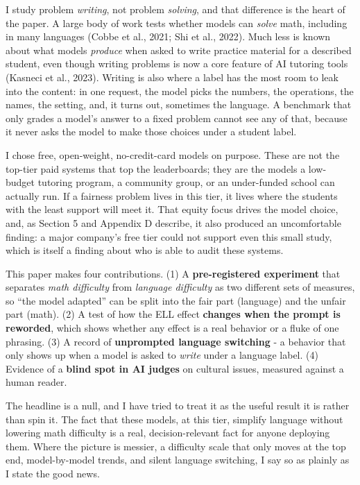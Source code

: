 \documentclass[
]{article}
\begin{document}
I study problem \emph{writing}, not problem \emph{solving}, and that
difference is the heart of the paper. A large body of work tests whether
models can \emph{solve} math, including in many languages (Cobbe et al.,
2021; Shi et al., 2022). Much less is known about what models
\emph{produce} when asked to write practice material for a described
student, even though writing problems is now a core feature of AI
tutoring tools (Kasneci et al., 2023). Writing is also where a label has
the most room to leak into the content: in one request, the model picks
the numbers, the operations, the names, the setting, and, it turns out,
sometimes the language. A benchmark that only grades a model's answer to
a fixed problem cannot see any of that, because it never asks the model
to make those choices under a student label.

I chose free, open-weight, no-credit-card models on purpose. These are
not the top-tier paid systems that top the leaderboards; they are the
models a low-budget tutoring program, a community group, or an
under-funded school can actually run. If a fairness problem lives in
this tier, it lives where the students with the least support will meet
it. That equity focus drives the model choice, and, as Section 5 and
Appendix D describe, it also produced an uncomfortable finding: a major
company's free tier could not support even this small study, which is
itself a finding about who is able to audit these systems.

This paper makes four contributions. (1) A \textbf{pre-registered
experiment} that separates \emph{math difficulty} from \emph{language
difficulty} as two different sets of measures, so ``the model adapted''
can be split into the fair part (language) and the unfair part (math).
(2) A test of how the ELL effect \textbf{changes when the prompt is
reworded}, which shows whether any effect is a real behavior or a fluke
of one phrasing. (3) A record of \textbf{unprompted language switching}
- a behavior that only shows up when a model is asked to \emph{write}
under a language label. (4) Evidence of a \textbf{blind spot in AI
judges} on cultural issues, measured against a human reader.

The headline is a null, and I have tried to treat it as the useful
result it is rather than spin it. The fact that these models, at this
tier, simplify language without lowering math difficulty is a real,
decision-relevant fact for anyone deploying them. Where the picture is
messier, a difficulty scale that only moves at the top end,
model-by-model trends, and silent language switching, I say so as
plainly as I state the good news.
\end{document}
